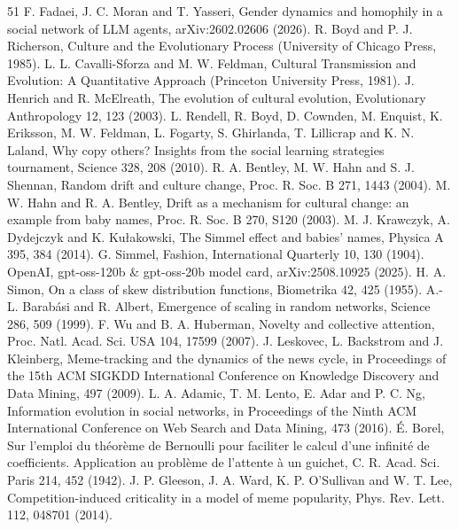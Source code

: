 \documentclass[11pt]{article}
\begin{document}
\begin{thebibliography}{51}
 F. Fadaei, J. C. Moran and T. Yasseri, Gender dynamics and homophily in a social network of LLM agents, arXiv:2602.02606 (2026).
 R. Boyd and P. J. Richerson, Culture and the Evolutionary Process (University of Chicago Press, 1985).
 L. L. Cavalli-Sforza and M. W. Feldman, Cultural Transmission and Evolution: A Quantitative Approach (Princeton University Press, 1981).
 J. Henrich and R. McElreath, The evolution of cultural evolution, Evolutionary Anthropology 12, 123 (2003).
 L. Rendell, R. Boyd, D. Cownden, M. Enquist, K. Eriksson, M. W. Feldman, L. Fogarty, S. Ghirlanda, T. Lillicrap and K. N. Laland, Why copy others? Insights from the social learning strategies tournament, Science 328, 208 (2010).
 R. A. Bentley, M. W. Hahn and S. J. Shennan, Random drift and culture change, Proc. R. Soc. B 271, 1443 (2004).
 M. W. Hahn and R. A. Bentley, Drift as a mechanism for cultural change: an example from baby names, Proc. R. Soc. B 270, S120 (2003).
 M. J. Krawczyk, A. Dydejczyk and K. Ku{\l}akowski, The Simmel effect and babies' names, Physica A 395, 384 (2014).
 G. Simmel, Fashion, International Quarterly 10, 130 (1904). %
 OpenAI, gpt-oss-120b \& gpt-oss-20b model card, arXiv:2508.10925 (2025).
 H. A. Simon, On a class of skew distribution functions, Biometrika 42, 425 (1955).
 A.-L. Barab\'asi and R. Albert, Emergence of scaling in random networks, Science 286, 509 (1999).
 F. Wu and B. A. Huberman, Novelty and collective attention, Proc. Natl. Acad. Sci. USA 104, 17599 (2007).
 J. Leskovec, L. Backstrom and J. Kleinberg, Meme-tracking and the dynamics of the news cycle, in Proceedings of the 15th ACM SIGKDD International Conference on Knowledge Discovery and Data Mining, 497 (2009).
 L. A. Adamic, T. M. Lento, E. Adar and P. C. Ng, Information evolution in social networks, in Proceedings of the Ninth ACM International Conference on Web Search and Data Mining, 473 (2016).
 \'E. Borel, Sur l'emploi du th\'eor\`eme de Bernoulli pour faciliter le calcul d'une infinit\'e de coefficients. Application au probl\`eme de l'attente \`a un guichet, C. R. Acad. Sci. Paris 214, 452 (1942).
 J. P. Gleeson, J. A. Ward, K. P. O'Sullivan and W. T. Lee, Competition-induced criticality in a model of meme popularity, Phys. Rev. Lett. 112, 048701 (2014).

\end{thebibliography}
\end{document}
